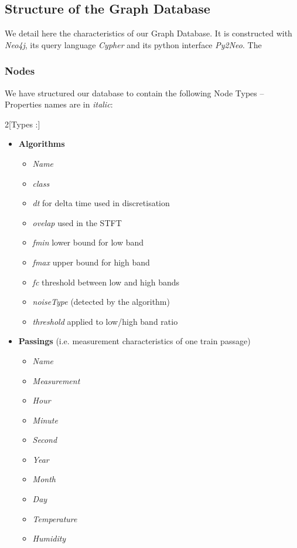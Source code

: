 \documentclass{article}\usepackage[]{graphicx}\usepackage[]{color}
\begin{document}
\subsection{\label{ssec:app:neo4jstruct}Structure of the Graph Database}
We detail here the characteristics of our Graph Database. It is constructed with {\it Neo4j}, its query language {\it Cypher} and its python interface {\it Py2Neo}. The 

\subsubsection{Nodes}
We have structured our database to contain the following Node Types -- Properties names are in {\it italic}:
\begin{multicols}{2}[Types :]
\begin{itemize}
\item {\bf Algorithms}
  \begin{itemize}
    \item {\it Name}
    \item {\it class}
    \item {\it dt} for delta time used in discretisation
    \item {\it ovelap} used in the STFT
    \item {\it fmin} lower bound for low band
    \item {\it fmax} upper bound for high band
    \item {\it fc} threshold between low and high bands
    \item {\it noiseType} (detected by the algorithm)
    \item {\it threshold} applied to low/high band ratio
  \end{itemize}
\item {\bf Passings} (i.e. measurement characteristics of one train passage)
  \begin{itemize}
    \item {\it Name}
    \item {\it Measurement}
    \item {\it Hour}
    \item {\it Minute}
    \item {\it Second}
    \item {\it Year}
    \item {\it Month}
    \item {\it Day}
    \item {\it Temperature}
    \item {\it Humidity}

\end{itemize}
\end{itemize}
\end{multicols}
\end{document}
